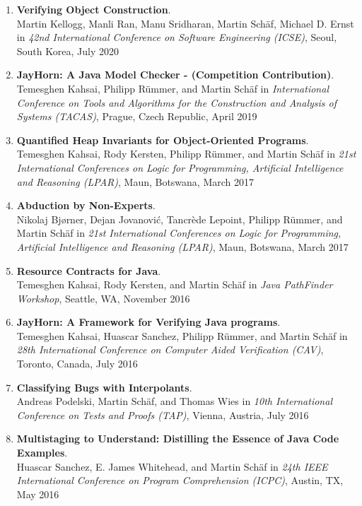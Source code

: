 \begin{enumerate}
\item \textbf{Verifying Object Construction}.
\\ Martin Kellogg, Manli Ran, Manu Sridharan, Martin Sch\"af, Michael D. Ernst in 
\emph{42nd International Conference on Software Engineering (ICSE)},
Seoul, South Korea, July 2020

\item \textbf{JayHorn: A Java Model Checker - (Competition Contribution)}.
\\ Temesghen Kahsai, Philipp R\"ummer, and Martin Sch\"af in 
\emph{International Conference on Tools and Algorithms for the Construction and Analysis of Systems (TACAS)},
Prague, Czech Republic, April 2019

\item \textbf{Quantified Heap Invariants for Object-Oriented Programs}.
\\ Temesghen Kahsai, Rody Kersten, Philipp R\"ummer, and Martin Sch\"af in 
\emph{21st International Conferences on Logic for Programming, Artificial Intelligence and Reasoning (LPAR)},
Maun, Botswana, March 2017

\item \textbf{Abduction by Non-Experts}.
\\ Nikolaj Bj{\o}rner, Dejan Jovanovi\'c, Tancr\`ede Lepoint, Philipp R\"ummer, and Martin Sch\"af in 
\emph{21st International Conferences on Logic for Programming, Artificial Intelligence and Reasoning (LPAR)},
Maun, Botswana, March 2017


\item \textbf{Resource Contracts for Java}.
\\ Temesghen Kahsai, Rody Kersten, and Martin Sch\"af in 
\emph{Java PathFinder Workshop},
Seattle, WA, November 2016

\item \textbf{JayHorn: A Framework for Verifying Java programs}.
\\ Temesghen Kahsai, Huascar Sanchez, Philipp R\"ummer, and Martin Sch\"af in 
\emph{28th International Conference on Computer Aided Verification (CAV)},
Toronto, Canada, July 2016


\item \textbf{Classifying Bugs with Interpolants}.
\\ Andreas Podelski, Martin Sch\"af, and Thomas Wies in 
\emph{10th International Conference on Tests and Proofs (TAP)},
Vienna, Austria, July 2016


\item \textbf{Multistaging to Understand: Distilling the Essence of Java Code Examples}.
\\ Huascar Sanchez, E. James Whitehead, and Martin Sch\"af in 
\emph{24th IEEE International Conference on Program Comprehension (ICPC)},
Austin, TX, May 2016



\end{enumerate}
